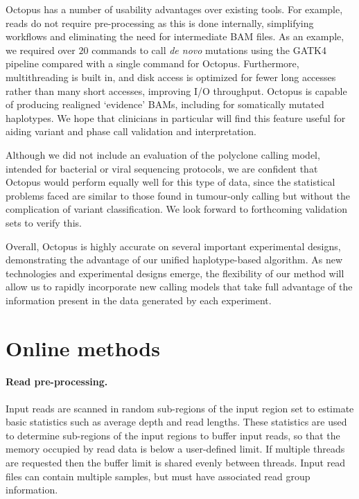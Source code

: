\documentclass[notitlepage, twocolumn, 10pt]{article}
\begin{document}
Octopus has a number of usability advantages over existing tools.  For example, reads do not require pre-processing as this is done internally, simplifying workflows and eliminating the need for intermediate BAM files. As an example, we required over $20$ commands to call \textit{de novo} mutations using the GATK4 pipeline compared with a single command for Octopus. Furthermore, multithreading is built in, and disk access is optimized for fewer long accesses rather than many short accesses, improving I/O throughput. Octopus is capable of producing realigned `evidence' BAMs, including for somatically mutated haplotypes. We hope that clinicians in particular will find this feature useful for aiding variant and phase call validation and interpretation.

Although we did not include an evaluation of the polyclone calling model, intended for bacterial or viral sequencing protocols, we are confident that Octopus would perform equally well for this type of data, since the statistical problems faced are similar to those found in tumour-only calling but without the complication of variant classification. We look forward to forthcoming validation sets \cite{RN165} to verify this.

Overall, Octopus is highly accurate on several important experimental designs, demonstrating the advantage of our unified haplotype-based algorithm. As new technologies and experimental designs emerge, the flexibility of our method will allow us to rapidly incorporate new calling models that take full advantage of the information present in the data generated by each experiment.




\section*{Online methods}\small

\paragraph*{Read pre-processing.} Input reads are scanned in random sub-regions of the input region set to estimate basic statistics such as average depth and read lengths. These statistics are used to determine sub-regions of the input regions to buffer input reads, so that the memory occupied by read data is below a user-defined limit. If multiple threads are requested then the buffer limit is shared evenly between threads. Input read files can contain multiple samples, but must have associated read group information.
\end{document}
